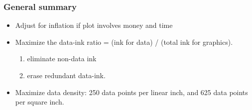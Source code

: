 \begin{frame}\frametitle{General summary}
	\begin{itemize}
		\item	Adjust for inflation if plot involves money and time 
		\item	Maximize the data-ink ratio = (ink for data) / (total ink for graphics). 
		\begin{enumerate}
			\item	eliminate non-data ink 
			\item	erase redundant data-ink. 
		\end{enumerate}
		\item	Maximize data density: 250 data points per linear inch, and 625 data points per square inch. 
	\end{itemize}
\end{frame}


